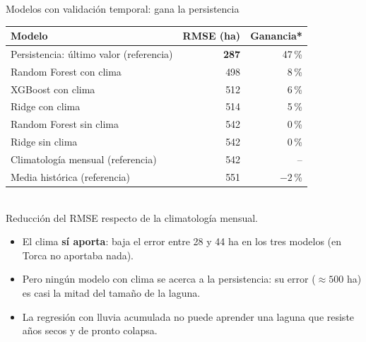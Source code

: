 \documentclass[10pt]{beamer}
\newcommand{\dato}[1]{\textbf{\color{blue!60!black}#1}}
\begin{document}
\begin{frame}{Modelos con validación temporal: gana la persistencia}
\centering
\small
\begin{tabular}{lrr}
\toprule
Modelo & RMSE (ha) & Ganancia* \\
\midrule
Persistencia: último valor (referencia) & \dato{287} & 47\,\% \\
Random Forest con clima & 498 & 8\,\% \\
XGBoost con clima & 512 & 6\,\% \\
Ridge con clima & 514 & 5\,\% \\
Random Forest sin clima & 542 & 0\,\% \\
Ridge sin clima & 542 & 0\,\% \\
Climatología mensual (referencia) & 542 & -- \\
Media histórica (referencia) & 551 & $-2$\,\% \\
\bottomrule
\end{tabular}\\[1mm]
{\scriptsize *Reducción del RMSE respecto de la climatología mensual.}
\vspace{3mm}
\begin{itemize}
\item El clima \textbf{sí aporta}: baja el error entre 28 y 44 ha en los tres modelos (en Torca no aportaba nada).
\item Pero ningún modelo con clima se acerca a la persistencia: su error (${\approx}500$ ha) es casi la mitad del tamaño de la laguna.
\item La regresión con lluvia acumulada no puede aprender una laguna que resiste años secos y de pronto colapsa.
\end{itemize}
\end{frame}
\end{document}
